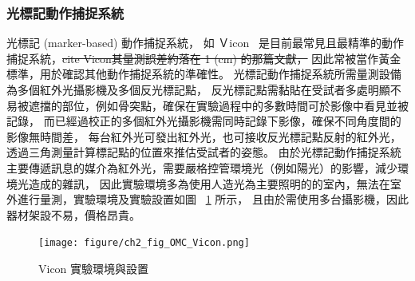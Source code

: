 \subsubsection{光標記動作捕捉系統}
光標記 (marker-based) 動作捕捉系統，
如 Ｖicon ~\cite{vicon_web}是目前最常見且最精準的動作捕捉系統，\sout{cite Vicon其量測誤差約落在 1 (cm) 的那篇文獻，}
因此常被當作黃金標準，用於確認其他動作捕捉系統的準確性。
光標記動作捕捉系統所需量測設備為多個紅外光攝影機及多個反光標記點，
反光標記點需黏貼在受試者多處明顯不易被遮擋的部位，例如骨突點，確保在實驗過程中的多數時間可於影像中看見並被記錄，
而已經過校正的多個紅外光攝影機需同時記錄下影像，確保不同角度間的影像無時間差，
每台紅外光可發出紅外光，也可接收反光標記點反射的紅外光，透過三角測量計算標記點的位置來推估受試者的姿態。
由於光標記動作捕捉系統主要傳遞訊息的媒介為紅外光，需要嚴格控管環境光（例如陽光）的影響，減少環境光造成的雜訊，
因此實驗環境多為使用人造光為主要照明的的室內，無法在室外進行量測，實驗環境及實驗設置如圖 ~\ref{ch2_fig_OMC_Vicon} 所示，
且由於需使用多台攝影機，因此器材架設不易，價格昂貴。

\begin{figure}[!ht]
    \centering
    \texttt{[image: figure/ch2\_fig\_OMC\_Vicon.png]}
     \caption[Vicon 實驗環境與設置]{Vicon 實驗環境與設置}
     \label{ch2_fig_OMC_Vicon}
 \end{figure}

